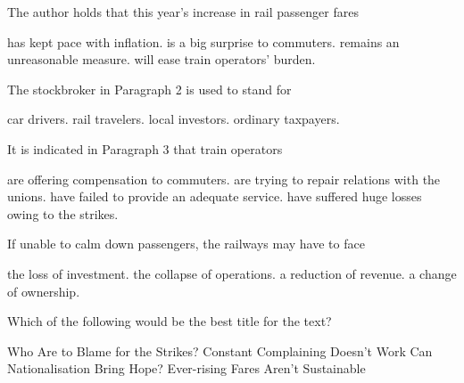 \item The author holds that this year's increase in rail passenger fares
\begin{tasks}
	\task has kept pace with inflation.
	\task is a big surprise to commuters.
	\task remains an unreasonable measure.
	\task will ease train operators' burden.
\end{tasks}
\item The stockbroker in Paragraph 2 is used to stand for
\begin{tasks}
	\task car drivers.
	\task rail travelers.
	\task local investors.
	\task ordinary taxpayers.
\end{tasks}
\item It is indicated in Paragraph 3 that train operators
\begin{tasks}
	\task are offering compensation to commuters.
	\task are trying to repair relations with the unions.
	\task have failed to provide an adequate service.
	\task have suffered huge losses owing to the strikes.
\end{tasks}
\item If unable to calm down passengers, the railways may have to face
\begin{tasks}
	\task the loss of investment.
	\task the collapse of operations.
	\task a reduction of revenue.
	\task a change of ownership.
\end{tasks}
\item Which of the following would be the best title for the text?
\begin{tasks}
	\task Who Are to Blame for the Strikes?
	\task Constant Complaining Doesn't Work
	\task Can Nationalisation Bring Hope?
	\task Ever-rising Fares Aren't Sustainable
\end{tasks}